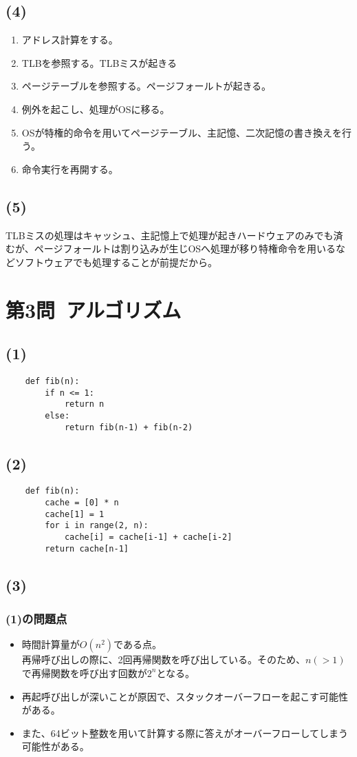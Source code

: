 \documentclass[a4paper,12pt,xelatex,ja=standard]{bxjsarticle}
\begin{document}
  \subsection*{(4)}
  \begin{enumerate}
    \item アドレス計算をする。
    \item TLBを参照する。TLBミスが起きる
    \item ページテーブルを参照する。ページフォールトが起きる。
    \item 例外を起こし、処理がOSに移る。
    \item OSが特権的命令を用いてページテーブル、主記憶、二次記憶の書き換えを行う。
    \item 命令実行を再開する。
  \end{enumerate}
  \subsection*{(5)}
  TLBミスの処理はキャッシュ、主記憶上で処理が起きハードウェアのみでも済むが、ページフォールトは割り込みが生じOSへ処理が移り特権命令を用いるなどソフトウェアでも処理することが前提だから。

\newpage
\section*{第3問\ アルゴリズム}
  \subsection*{(1)}
  \begin{lstlisting}
    def fib(n):
        if n <= 1:
            return n
        else:
            return fib(n-1) + fib(n-2)
  \end{lstlisting}
  \subsection*{(2)}
  \begin{lstlisting}
    def fib(n):
        cache = [0] * n
        cache[1] = 1
        for i in range(2, n):
            cache[i] = cache[i-1] + cache[i-2]
        return cache[n-1]
  \end{lstlisting}
  \subsection*{(3)}
    \subsubsection*{(1)の問題点}
    \begin{itemize}
      \item 時間計算量が\(O(n^2)\)である点。\\
        再帰呼び出しの際に、2回再帰関数を呼び出している。そのため、\(n (> 1)\)で再帰関数を呼び出す回数が\(2^n\)となる。\\
      \item 再起呼び出しが深いことが原因で、スタックオーバーフローを起こす可能性がある。
      \item また、64ビット整数を用いて計算する際に答えがオーバーフローしてしまう可能性がある。
    \end{itemize}
\end{document}
